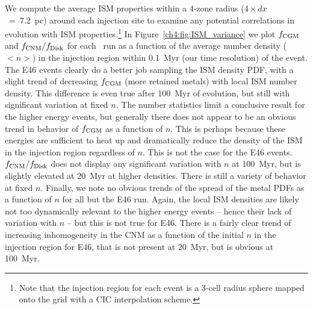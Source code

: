We compute the average ISM properties within a 4-zone radius ($4 \times dx$~=~7.2~pc) around each injection site to examine any potential correlations in evolution with ISM properties.\footnote{Note that the injection region for each event is a 3-cell radius sphere mapped onto the grid with a CIC interpolation scheme.} In Figure~\ref{ch4:fig:ISM_variance} we plot $f_{\rm CGM}$ and $f_{\rm CNM} / f_{\rm Disk}$ for each \runonenu~run as a function of the average number density ($<n>$) in the injection region within 0.1~Myr (our time resolution) of the event. The E46 events clearly do a better job sampling the ISM density PDF, with a slight trend of decreasing $f_{\rm CGM}$ (more retained metals) with local ISM number density. This difference is even true after 100~Myr of evolution, but still with significant variation at fixed $n$. The number statistics limit a conclusive result for the higher energy events, but generally there does not appear to be an obvious trend in behavior of $f_{\rm CGM}$ as a function of $n$. This is perhaps because these energies are sufficient to heat up and dramatically reduce the density of the ISM in the injection region regardless of $n$. This is not the case for the E46 events. $f_{\rm CNM} / f_{\rm Disk}$ does not display any significant variation with $n$ at 100~Myr, but is slightly elevated at 20~Myr at higher densities. There is still a variety of behavior at fixed $n$. Finally, we note no obvious trends of the spread of the metal PDFs as a function of $n$ for all but the E46 run. Again, the local ISM densities are likely not too dynamically relevant to the higher energy events -- hence their lack of variation with $n$ -- but this is not true for E46. There is a fairly clear trend of increasing inhomogeneity in the CNM as a function of the initial $n$ in the injection region for E46, that is not present at 20~Myr, but is obvious at 100~Myr.

